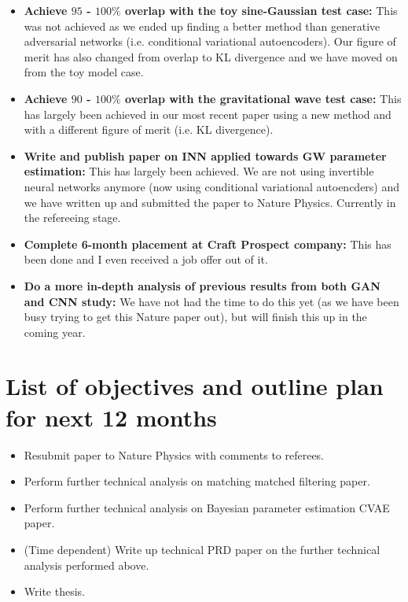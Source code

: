 \begin{itemize}
    \item \textbf{Achieve $95$ - $100\%$ overlap with the toy sine-Gaussian test case:} This was not achieved as we ended up finding a better method than generative adversarial networks (i.e. conditional variational autoencoders). Our figure of merit has also changed from overlap to KL divergence and we have moved on from the toy model case.
    \item \textbf{Achieve $90$ - $100\%$ overlap with the gravitational wave test case:} This has largely been achieved in our most recent paper using a new method and with a different figure of merit (i.e. KL divergence).
    \item \textbf{Write and publish paper on INN applied towards GW parameter estimation:} This has largely been achieved. We are not using invertible neural networks anymore (now using conditional variational autoencders) and we have written up and submitted the paper to Nature Physics. Currently in the refereeing stage.
    \item \textbf{Complete 6-month placement at Craft Prospect company:} This has been done and I even received a job offer out of it.
    \item \textbf{Do a more in-depth analysis of previous results from both GAN and CNN study:} We have not had the time to do this yet (as we have been busy trying to get this Nature paper out), but will finish this up in the coming year.
    
\end{itemize}

\chapter{List of objectives and outline plan for next 12 months}

\begin{itemize}
    \item Resubmit paper to Nature Physics with comments to referees.
    \item Perform further technical analysis on matching matched filtering paper.
    \item Perform further technical analysis on Bayesian parameter estimation CVAE paper.
    \item (Time dependent) Write up technical PRD paper on the further technical analysis performed above.
    \item Write thesis.
\end{itemize}

